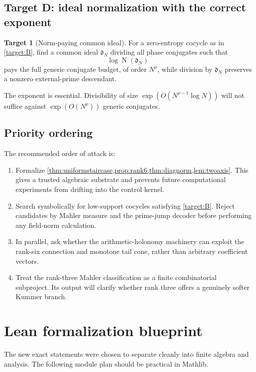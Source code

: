 \documentclass[11pt]{article}
\theoremstyle{definition}
\newtheorem{target}[theorem]{Target}
\theoremstyle{remark}
\newcommand{\Norm}{\operatorname{N}}
\begin{document}
\subsection{Target D: ideal normalization with the correct exponent}

\begin{target}[Norm-paying common ideal]\label{target:D}
For a zero-entropy cocycle as in \cref{target:B}, find a common ideal
$\mathfrak d_N$ dividing all phase conjugates such that
\[
 \log\Norm(\mathfrak d_N)
\]
pays the full generic conjugate budget, of order $N^\rho$, while division by
$\mathfrak d_N$ preserves a nonzero external-prime descendant.
\end{target}

The exponent is essential.  Divisibility of size $\exp(O(N^{\rho-1}\log N))$
will not suffice against $\exp(O(N^\rho))$ generic conjugates.

\subsection{Priority ordering}

The recommended order of attack is:
\begin{enumerate}
\item Formalize \cref{thm:uniformstaircase,prop:rank6,thm:diagnorm,lem:twoaxis}.
This gives a trusted algebraic substrate and prevents future computational
experiments from drifting into the control kernel.
\item Search symbolically for low-support cocycles satisfying
\cref{target:B}.  Reject candidates by Mahler measure and the prime-jump decoder
before performing any field-norm calculation.
\item In parallel, ask whether the arithmetic-holonomy machinery can exploit the
rank-six connection and monotone tail cone, rather than arbitrary coefficient
vectors.
\item Treat the rank-three Mahler classification as a finite combinatorial
subproject.  Its output will clarify whether rank three offers a genuinely softer
Kummer branch.
\end{enumerate}

\section{Lean formalization blueprint}

The new exact statements were chosen to separate cleanly into finite algebra and
analysis.  The following module plan should be practical in Mathlib.
\end{document}
